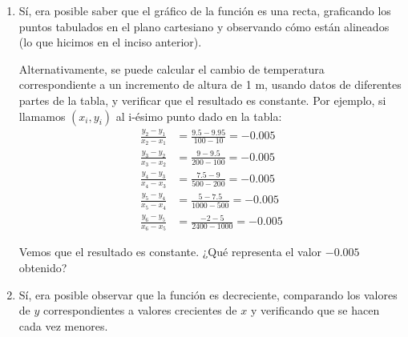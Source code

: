 \documentclass[12pt]{article}
\begin{document}
\begin{enumerate}
\begin{enumerate}
	\item  Sí, era posible saber que el gráfico de la función es una recta, graficando los puntos tabulados en el plano cartesiano y observando cómo están alineados (lo que hicimos en el inciso anterior).\par
	Alternativamente, se puede calcular el cambio de temperatura correspondiente a un incremento de altura de 1 m, usando datos de diferentes partes de la tabla, y verificar que el resultado es constante. Por ejemplo, si llamamos $(x_i,y_i)$ al i-ésimo punto dado en la tabla:
	\begin{eqnarray}
    \frac{y_2 - y_1}{x_2 - x_1} &= \frac{9.5 - 9.95}{100 - 10} = -0.005\\
    \frac{y_3 - y_2}{x_3 - x_2} &= \frac{9 - 9.5}{200 - 100} = -0.005\\
    \frac{y_4 - y_3}{x_4 - x_3} &= \frac{7.5 - 9}{500 - 200} = -0.005\\
    \frac{y_5 - y_4}{x_5 - x_4} &= \frac{5 - 7.5}{1000 - 500} = -0.005\\
    \frac{y_6 - y_5}{x_6 - x_5} &= \frac{-2 - 5}{2400 - 1000} = -0.005
    \end{eqnarray}
    
    Vemos que el resultado es constante. ¿Qué representa el valor $-0.005$ obtenido?

	\item Sí, era posible observar que la función es decreciente, comparando los valores de $y$ correspondientes a valores crecientes de $x$ y verificando que se hacen cada vez menores.
\end{enumerate}


\end{enumerate}
\end{document}
